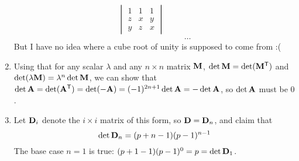\documentclass[fleqn,a4paper,11pt]{article}
\begin{document}
\begin{enumerate}[label=\textbf{\arabic*.}]
\begin{alignat*}
\begin{vmatrix}
     1 & 1 & 1 \\
     z & x & y \\
     y & z & x
    \end{vmatrix} \\
    && &\dots
   \end{alignat*}
   But I have no idea where a cube root of unity is supposed to come from :(
  \item
   Using that for any scalar \(\lambda\) and any \(n \times n\) matrix
   \(\mathbf{M}\), \(\det\mathbf{M} = \det(\mathbf{M}^{\mathsf T})\) and
   \(\det(\lambda \mathbf{M}) = \lambda^n \det\mathbf{M}\), we can show that
   \(\det\mathbf{A} = \det(\mathbf{A}^{\mathsf T})
     = \det(-\mathbf{A}) = (-1)^{2n + 1}\det\mathbf{A} = -\det\mathbf{A}\), so
   \(\det\mathbf{A}\) must be \(0\).
  \item
   Let \(\mathbf{D}_i\) denote the \(i \times i\) matrix of this form, so
   \(\mathbf{D} = \mathbf{D}_n\), and claim that
   \begin{equation*}
    \det \mathbf{D}_n = (p + n - 1)(p - 1)^{n - 1}
   \end{equation*}
   The base case \(n = 1\) is true:
   \((p + 1 - 1)(p - 1)^0 = p = \det \mathbf{D}_1\).


\end{enumerate}
\end{document}
